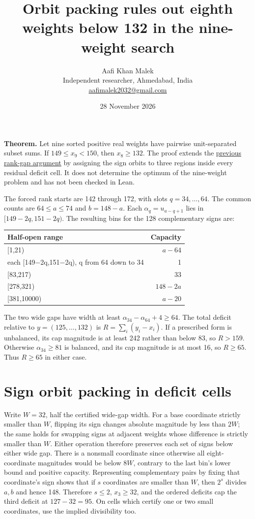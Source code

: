 \documentclass[11pt,letterpaper]{article}
\title{Orbit packing rules out eighth weights below 132 in the nine-weight search}
\author{Aafi Khan Malek\\ \small Independent researcher, Ahmedabad, India\\
\small\href{mailto:aafimalek2032@gmail.com}{aafimalek2032@gmail.com}}
\date{28 November 2026}
\begin{document}
\maketitle
\textbf{Theorem.} Let nine sorted positive real weights have pairwise
unit-separated subset sums. If \(149\le x_9<150\), then \(x_8\ge132\).
The proof extends the
\href{https://github.com/Aafimalek/novel-discoveries/tree/484f4f670bba27fa3c0eec23ceae0db0a923940a/nine-separated-subset-sums/verification/rank-cuts-below-150/penultimate-cap-130}{previous rank-gap argument}
by assigning the sign orbits to three regions inside every residual
deficit cell. It does not determine the optimum of the nine-weight
problem and has not been checked in Lean.

The forced rank starts are 142 through 172, with slots
\(q=34,\dots,64\). The common counts are \(64\le a\le74\) and
\(b=148-a\). Each \(\alpha_q=u_{a-q+1}\) lies in \([149-2q,151-2q)\).
The resulting bins for the 128 complementary signs are:

\begin{longtable}[]{@{}lr@{}}
\toprule\noalign{}
Half-open range & Capacity \\
\midrule\noalign{}
\endhead
\bottomrule\noalign{}
\endlastfoot
{[}1,21) & \(a-64\) \\
each {[}149−2q,151−2q), q from 64 down to 34 & 1 \\
{[}83,217) & 33 \\
{[}278,321) & \(148-2a\) \\
{[}381,10000) & \(a-20\) \\
\end{longtable}

The two wide gaps have width at least
\(\alpha_{34}-\alpha_{64}+4\ge64\). The total deficit relative to
\(y=(125,\ldots,132)\) is \(R=\sum_i(y_i-x_i)\). If a prescribed form is
unbalanced, its cap magnitude is at least 242 rather than below 83, so
\(R>159\). Otherwise \(\alpha_{34}\ge81\) is balanced, and its cap
magnitude is at most 16, so \(R\ge65\). Thus \(R\ge65\) in either case.

\section{Sign orbit packing in deficit
cells}\label{sign-orbit-packing-in-deficit-cells}

Write \(W=32\), half the certified wide-gap width. For a base coordinate
strictly smaller than \(W\), flipping its sign changes absolute
magnitude by less than \(2W\); the same holds for swapping signs at
adjacent weights whose difference is strictly smaller than \(W\). Either
operation therefore preserves each set of signs below either wide gap.
There is a nonsmall coordinate since otherwise all eight-coordinate
magnitudes would be below \(8W\), contrary to the last bin's lower bound
and positive capacity. Representing complementary pairs by fixing that
coordinate's sign shows that if \(s\) coordinates are smaller than
\(W\), then \(2^s\) divides \(a,b\) and hence 148. Therefore \(s\le2\),
\(x_3\ge32\), and the ordered deficits cap the third deficit at
\(127-32=95\). On cells which certify one or two small coordinates, use
the implied divisibility too.
\end{document}
